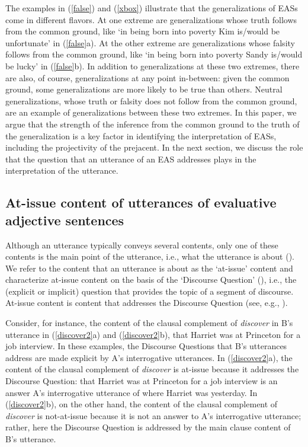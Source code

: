 \documentclass[11pt,fleqn]{article}
\newcommand{\6}{\mbox{$[\hspace*{-.6mm}[$}}
\newcommand{\9}{\mbox{$]\hspace*{-.6mm}]$}}
\begin{document}
The examples in (\ref{false}) and (\ref{xbox}) illustrate that the generalizations of EASs come in different flavors. At one extreme are generalizations whose truth follows from the common ground, like `in being born into poverty Kim is/would be unfortunate' in (\ref{false}a). At the other extreme are generalizations whose falsity follows from the common ground, like `in being born into poverty Sandy is/would be lucky' in (\ref{false}b). In addition to generalizations at these two extremes, there are also, of course, generalizations at any point in-between: given the common ground, some generalizations are more likely to be true than others. Neutral generalizations, whose truth or falsity does not follow from the common ground, are an example of generalizations between these two extremes. In this paper, we argue that the strength of the inference from the common ground to the truth of the generalization is a key factor in identifying the interpretation of EASs, including the projectivity of the prejacent. In the next section, we discuss the role that the question that an utterance of an EAS addresses plays in the interpretation of the utterance.

\subsection{At-issue content of utterances of evaluative adjective sentences}\label{s32}

Although an utterance typically conveys several contents, only one of these contents is the main point of the utterance, i.e., what the utterance is about (\citealt{potts05}). We refer to the content that an utterance is about as the `at-issue' content and characterize at-issue content on the basis of the `Discourse Question' (\citealt{best-question}), i.e., the (explicit or implicit) question that provides the topic of a segment of discourse. At-issue content is content that addresses the Discourse Question (see, e.g., \citealt{brst-salt10,brst-ar}).

Consider, for instance, the content of the clausal complement of {\em discover} in B's utterance in (\ref{discover2}a) and (\ref{discover2}b), that Harriet was at Princeton for a job interview. In these examples, the Discourse Questions that B's utterances address are made explicit by A's interrogative utterances. In (\ref{discover2}a), the content of the clausal complement of {\em discover} is at-issue because it addresses the Discourse Question: that Harriet was at Princeton for a job interview is an answer A's interrogative utterance of where Harriet was yesterday. In (\ref{discover2}b), on the other hand, the content of the clausal complement of {\em discover} is not-at-issue because it is not an answer to A's interrogative utterance; rather, here the Discourse Question is addressed by the main clause content of B's utterance.
\end{document}
